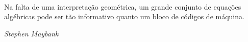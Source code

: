 \quad\\
\vspace{21 cm}

\noindent Na falta de uma interpretação geométrica, um grande conjunto de equações algébricas pode ser tão informativo quanto um bloco de códigos de máquina.

\begin{flushright}
{\it Stephen Maybank}
\end{flushright}

\newpage
